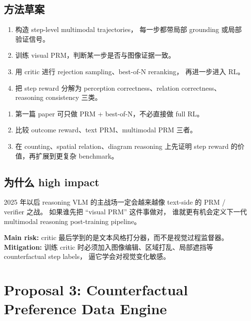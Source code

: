 \documentclass[12pt,a4paper]{article}
\begin{document}
\subsection{方法草案}

\begin{enumerate}[leftmargin=2em]
  \item 构造 step-level multimodal trajectories，
    每一步都带局部 grounding 或局部验证信号。
  \item 训练 visual PRM，判断某一步是否与图像证据一致。
  \item 用 critic 进行 rejection sampling、best-of-N reranking，
    再进一步进入 RL。
  \item 把 step reward 分解为 perception correctness、relation correctness、reasoning consistency 三类。
\end{enumerate}

\begin{expbox}
\begin{enumerate}[leftmargin=2em]
  \item 第一篇 paper 可只做 PRM + best-of-N，不必直接做 full RL。
  \item 比较 outcome reward、text PRM、multimodal PRM 三者。
  \item 在 counting、spatial relation、diagram reasoning 上先证明 step reward 的价值，再扩展到更复杂 benchmark。
\end{enumerate}
\end{expbox}

\subsection{为什么 high impact}

2025 年以后 reasoning VLM 的主战场一定会越来越像 text-side 的 PRM / verifier 之战。
如果谁先把 ``visual PRM'' 这件事做对，
谁就更有机会定义下一代 multimodal reasoning post-training pipeline。

\begin{riskbox}
\textbf{Main risk:}
critic 最后学到的是文本风格打分器，而不是视觉过程监督器。\\
\textbf{Mitigation:}
训练 critic 时必须加入图像编辑、区域打乱、局部遮挡等 counterfactual step labels，
逼它学会对视觉变化敏感。
\end{riskbox}

\newpage
\section{Proposal 3: Counterfactual Preference Data Engine}
\end{document}
